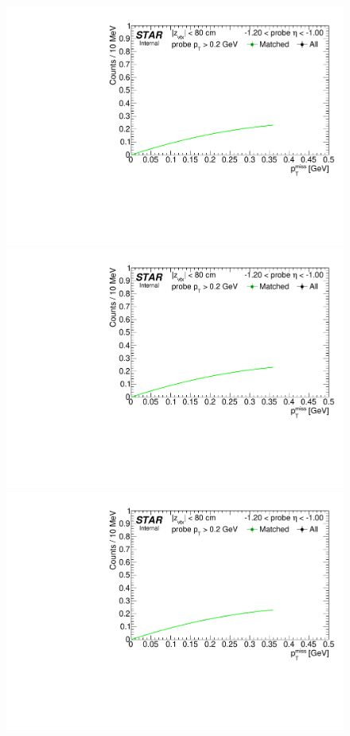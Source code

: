 \begin{figure}[ht]\ContinuedFloat
\centering
\parbox{0.495\textwidth}{
  \centering
  
  \includegraphics[width=\linewidth,page=6]{graphics/systematicsEfficiency/TOF_tagAndProbe/Fitting_effVsEta_data.pdf}\\
  \includegraphics[width=\linewidth,page=7]{graphics/systematicsEfficiency/TOF_tagAndProbe/Fitting_effVsEta_data.pdf}\\
  \includegraphics[width=\linewidth,page=8]{graphics/systematicsEfficiency/TOF_tagAndProbe/Fitting_effVsEta_data.pdf}\\
}
\end{figure}

